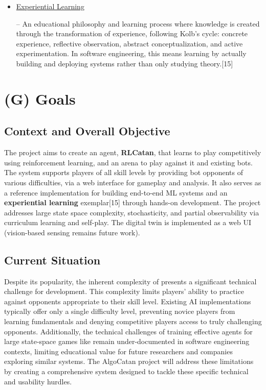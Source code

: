 \documentclass{article}
\newcommand{\ExperientialLearningExt}{\href{https://en.wikipedia.org/wiki/Experiential_learning}{Experiential Learning}}
\begin{document}
\begin{itemize}
    \item \hypertarget{glossary-experiential}{\ExperientialLearningExt} – An educational philosophy and learning process where knowledge is created through the transformation of experience, following Kolb's cycle: concrete experience, reflective observation, abstract conceptualization, and active experimentation. In software engineering, this means learning by actually building and deploying systems rather than only studying theory.[15]
\end{itemize}



\section*{(G) Goals}\label{sec:srs-goals}
\renewcommand{\thesubsection}{G.\arabic{subsection}}
\renewcommand{\theHsubsection}{G.\arabic{subsection}}
\setcounter{subsection}{0}

\subsection{Context and Overall Objective}\label{subsec:context-and-overall-objective}
The project aims to create an \AI{} agent, \textbf{RLCatan}, that learns to play \emph{\Catan{}} competitively
using reinforcement learning, and an arena to play against it and existing bots.
The system supports players of all skill levels by providing bot opponents of various difficulties,
via a web interface for gameplay and analysis.
It also serves as a reference implementation for building end-to-end ML systems and an \textbf{experiential learning}
exemplar[15] through hands-on development.
The project addresses large state space complexity, stochasticity, and partial observability via curriculum learning
and self-play.
The digital twin is implemented as a web UI (vision-based sensing remains future work).

\subsection{Current Situation}\label{subsec:current-situation}
Despite its popularity, the inherent complexity of \emph{\Catan{}} presents a significant technical challenge
for \AI{} development.
This complexity limits players' ability to practice against opponents appropriate to their skill level.
Existing \emph{\Catan{}} AI implementations typically offer only a single difficulty level, preventing novice
players from learning fundamentals and denying competitive players access to truly challenging opponents.
Additionally, the technical challenges of training effective \AI{} agents for large state-space games
like \emph{\Catan{}} remain under-documented in software engineering contexts, limiting educational value
for future researchers and companies exploring similar \AI{} systems.
The AlgoCatan project will address these limitations by creating a comprehensive system designed to tackle
these specific technical and usability hurdles.
\end{document}
